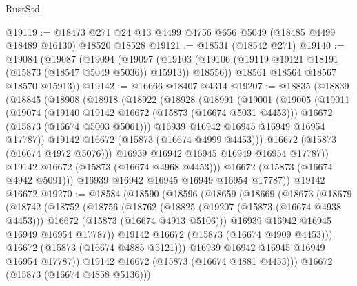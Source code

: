 \begin{lexlean}{RustStd}
\begin{coremodule}
@19119 := @18473 @271 @24 @13 @4499 @4756 @656 @5049 (@18485 @4499 @18489 @16130) @18520 @18528
@19121 := @18531 (@18542 @271)
@19140 := @19084
    (@19087
      (@19094
        (@19097
          (@19103 (@19106 (@19119 @19121 @18191 (@15873 (@18547 @5049 @5036)) @15913)) @18556))
        @18561
        @18564
        @18567
        @18570
        @15913))
@19142 := @16666 @18407 @4314
@19207 := @18835
    (@18839
      (@18845
        (@18908
          (@18918
            (@18922
              (@18928
                (@18991
                  (@19001
                    (@19005
                      (@19011
                        (@19074
                          (@19140 @19142 @16672 (@15873 (@16674 @5031 @4453)))
                          @16672
                          (@15873 (@16674 @5003 @5061)))
                        @16939
                        @16942
                        @16945
                        @16949
                        @16954
                        @17787))
                    @19142
                    @16672
                    (@15873 (@16674 @4999 @4453)))
                  @16672
                  (@15873 (@16674 @4972 @5076)))
                @16939
                @16942
                @16945
                @16949
                @16954
                @17787))
            @19142
            @16672
            (@15873 (@16674 @4968 @4453)))
          @16672
          (@15873 (@16674 @4942 @5091)))
        @16939
        @16942
        @16945
        @16949
        @16954
        @17787))
    @19142
    @16672
@19270 := @18584
    (@18590
      (@18596
        (@18659
          (@18669
            (@18673
              (@18679
                (@18742
                  (@18752
                    (@18756
                      (@18762
                        (@18825
                          (@19207 (@15873 (@16674 @4938 @4453)))
                          @16672
                          (@15873 (@16674 @4913 @5106)))
                        @16939
                        @16942
                        @16945
                        @16949
                        @16954
                        @17787))
                    @19142
                    @16672
                    (@15873 (@16674 @4909 @4453)))
                  @16672
                  (@15873 (@16674 @4885 @5121)))
                @16939
                @16942
                @16945
                @16949
                @16954
                @17787))
            @19142
            @16672
            (@15873 (@16674 @4881 @4453)))
          @16672
          (@15873 (@16674 @4858 @5136)))

\end{coremodule}
\end{lexlean}
